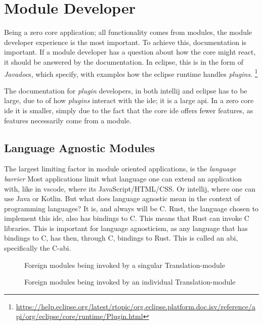 \section{Module Developer}

Being a zero core application; all functionality comes from modules, the module
developer experience is the most important. To achieve this, documentation is
important. If a module developer has a question about how the core might react,
it should be answered by the documentation. In \gls{eclipse}, this is in the
form of \textit{Javadoc}s, which specify, with examples how the \gls{eclipse}
runtime handles \textit{plugins}. \footnote{\url{https://help.eclipse.org/latest/rtopic/org.eclipse.platform.doc.isv/reference/api/org/eclipse/core/runtime/Plugin.html}}

The documentation for \textit{plugin} developers, in both \gls{intellij} and
\gls{eclipse} has to be large, due to of how \textit{plugins} interact with the
\gls{ide}; it is a large \gls{api}. In a zero core \gls{ide} it is smaller,
simply due to the fact that the core \gls{ide} offers fewer features, as features
necessarily come from a module.

\subsection{Language Agnostic Modules}

The largest limiting factor in module oriented applications, is the
\textit{language barrier} Most applications limit what language one can extend
an application with, like in \gls{vscode}, where its JavaScript/HTML/CSS. Or
\gls{intellij}, where one can use Java or Kotlin. But what does language agnostic
mean in the context of programming languages? It is, and always will be C. Rust,
the language chosen to implement this \gls{ide}, also has bindings to C. This
means that Rust can invoke C libraries. This is important for language
agnosticism, as any language that has bindings to C, has then, through C,
bindings to Rust. This is called an \gls{abi}, specifically the C-\gls{abi}.

\begin{figure}
  \begin{center}
    
    \caption{Foreign modules being invoked by a singular Translation-module}
    \label{fig:fm1}
  \end{center}
\end{figure}

\begin{figure}
  \begin{center}
    
    \caption{Foreign modules being invoked by an individual Translation-module}
    \label{fig:fm2}
  \end{center}
\end{figure}

